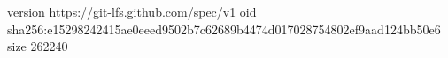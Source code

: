 version https://git-lfs.github.com/spec/v1
oid sha256:e15298242415ae0eeed9502b7c62689b4474d017028754802ef9aad124bb50e6
size 262240
